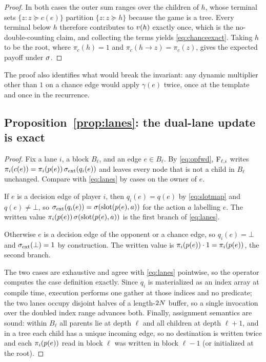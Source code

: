 \begin{proof}
In both cases the outer sum ranges over the children of $h$, whose terminal sets
$\{z : z \succeq c(e)\}$ partition $\{z : z \succeq h\}$ because the game is a tree.
Every terminal below $h$ therefore contributes to $v(h)$ exactly once, which is the
no-double-counting claim, and collecting the terms yields \cref{eq:chanceexact}. Taking
$h$ to be the root, where $\pi_c(h) = 1$ and $\pi_c(h \!\to\! z) = \pi_c(z)$, gives the
expected payoff under $\sigma$.
\end{proof}

The proof also identifies what would break the invariant: any dynamic multiplier other
than $1$ on a chance edge would apply $\gamma(e)$ twice, once at the template and once
in the recurrence.

\subsection{Proposition~\ref{prop:lanes}: the dual-lane update is exact}

\begin{proof}
Fix a lane $i$, a block $B_\ell$, and an edge $e \in B_\ell$. By \cref{eq:opfwd},
$\mathrm{F}_{\ell,i}$ writes $\pi_i(c(e)) = \pi_i(p(e))\, \sigma_{\mathrm{ext}}(q_i(e))$
and leaves every node that is not a child in $B_\ell$ unchanged. Compare with
\cref{eq:lanes} by cases on the owner of $e$.

If $e$ is a decision edge of player $i$, then $q_i(e) = q(e)$ by \cref{eq:slotmap} and
$q(e) \neq \bot$, so $\sigma_{\mathrm{ext}}(q_i(e)) = \sigma(\mathrm{slot}(p(e), a))$
for the action $a$ labelling $e$. The written value
$\pi_i(p(e))\, \sigma(\mathrm{slot}(p(e), a))$ is the first branch of
\cref{eq:lanes}.

Otherwise $e$ is a decision edge of the opponent or a chance edge, so $q_i(e) = \bot$
and $\sigma_{\mathrm{ext}}(\bot) = 1$ by construction. The written value is
$\pi_i(p(e)) \cdot 1 = \pi_i(p(e))$, the second branch.

The two cases are exhaustive and agree with \cref{eq:lanes} pointwise, so the operator
computes the case definition exactly. Since $q_i$ is materialized as an index array at
compile time, execution performs one gather at those indices and no predicate; the two
lanes occupy disjoint halves of a length-$2N$ buffer, so a single invocation over
the doubled index range advances both. Finally, assignment semantics are sound: within
$B_\ell$ all parents lie at depth $\ell$ and all children at depth $\ell+1$, and in a
tree each child has a unique incoming edge, so no destination is written twice and each
$\pi_i(p(e))$ read in block $\ell$ was written in block $\ell - 1$ (or initialized at
the root).
\end{proof}

